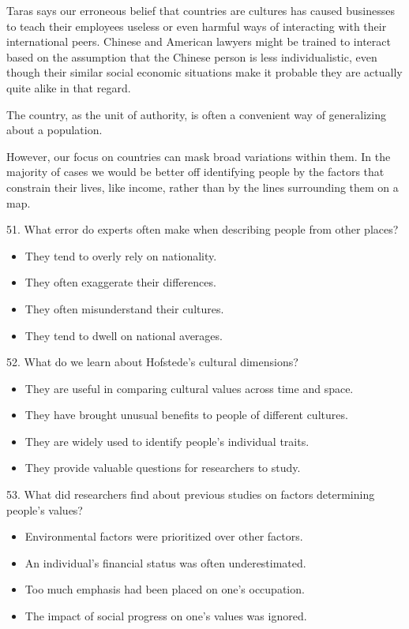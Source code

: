 \documentclass[UTF8,11pt]{ctexart}
\begin{document}
Taras says our erroneous belief that countries are cultures has caused businesses to teach their employees useless or even harmful ways of interacting with their international peers. Chinese and American lawyers might be trained to interact based on the assumption that the Chinese person is less individualistic, even though their similar social economic situations make it probable they are actually quite alike in that regard.


The country, as the unit of authority, is often a convenient way of generalizing about a population.


However, our focus on countries can mask broad variations within them. In the majority of cases we would be better off identifying people by the factors that constrain their lives, like income, rather than by the lines surrounding them on a map.


51. What error do experts often make when describing people from other places?


\begin{itemize}[leftmargin=2em,itemsep=.2em,topsep=.4em]\item[A.] They tend to overly rely on nationality.
\item[B.] They often exaggerate their differences.
\item[C.] They often misunderstand their cultures.
\item[D.] They tend to dwell on national averages.
\end{itemize}

52. What do we learn about Hofstede's cultural dimensions?


\begin{itemize}[leftmargin=2em,itemsep=.2em,topsep=.4em]\item[A.] They are useful in comparing cultural values across time and space.
\item[B.] They have brought unusual benefits to people of different cultures.
\item[C.] They are widely used to identify people's individual traits.
\item[D.] They provide valuable questions for researchers to study.
\end{itemize}

53. What did researchers find about previous studies on factors determining people's values?


\begin{itemize}[leftmargin=2em,itemsep=.2em,topsep=.4em]\item[A.] Environmental factors were prioritized over other factors.
\item[B.] An individual's financial status was often underestimated.
\item[C.] Too much emphasis had been placed on one's occupation.
\item[D.] The impact of social progress on one's values was ignored.
\end{itemize}
\end{document}
